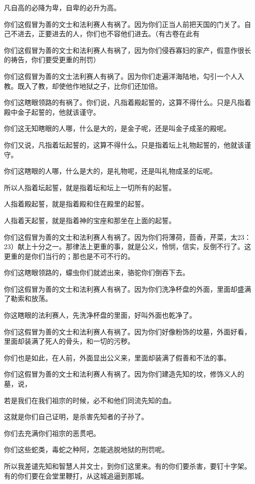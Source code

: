 \documentclass[12pt,oneside]{book}
\begin{document}
凡自高的必降为卑，自卑的必升为高。

你们这假冒为善的文士和法利赛人有祸了。因为你们正当人前把天国的门关了。自己不进去，正要进去的人，你们也不容他们进去。（有古卷在此有

你们这假冒为善的文士和法利赛人有祸了，因为你们侵吞寡妇的家产，假意作很长的祷告，你们要受更重的刑罚）

你们这假冒为善的文士法利赛人有祸了。因为你们走遍洋海陆地，勾引一个人入教。既入了教，却使他作地狱之子，比你们还加倍。

你们这瞎眼领路的有祸了。你们说，凡指着殿起誓的，这算不得什么。只是凡指着殿中金子起誓的，他就该谨守。

你们这无知瞎眼的人哪，什么是大的，是金子呢，还是叫金子成圣的殿呢。

你们又说，凡指着坛起誓的，这算不得什么。只是指着坛上礼物起誓的，他就该谨守。

你们这瞎眼的人哪，什么是大的，是礼物呢，还是叫礼物成圣的坛呢。

所以人指着坛起誓，就是指着坛和坛上一切所有的起誓。

人指着殿起誓，就是指着殿和住在殿里的起誓。

人指着天起誓，就是指着神的宝座和那坐在上面的起誓。

你们这假冒为善的文士和法利赛人有祸了。因为你们将薄荷，茴香，芹菜，太23：23）献上十分之一。那律法上更重的事，就是公义，怜悯，信实，反倒不行了。这更重的是你们当行的；那也是不可不行的。

你们这瞎眼领路的，蠓虫你们就滤出来，骆驼你们倒吞下去。

你们这假冒为善的文士和法利赛人有祸了。因为你们洗净杯盘的外面，里面却盛满了勒索和放荡。

你这瞎眼的法利赛人，先洗净杯盘的里面，好叫外面也乾净了。

你们这假冒为善的文士和法利赛人有祸了。因为你们好像粉饰的坟墓，外面好看，里面却装满了死人的骨头，和一切的污秽。

你们也是如此，在人前，外面显出公义来，里面却装满了假善和不法的事。

你们这假冒为善的文士和法利赛人有祸了。因为你们建造先知的坟，修饰义人的墓，说，

若是我们在我们祖宗的时候，必不和他们同流先知的血。

这就是你们自己证明，是杀害先知者的子孙了。

你们去充满你们祖宗的恶贯吧。

你们这些蛇类，毒蛇之种阿，怎能逃脱地狱的刑罚呢。

所以我差谴先知和智慧人并文士，到你们这里来。有的你们要杀害，要钉十字架。有的你们要在会堂里鞭打，从这城追逼到那城。
\end{document}
